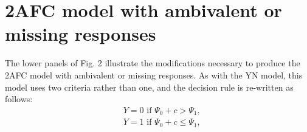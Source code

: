 \documentclass[man]{apa6}
\begin{document}
\section{2AFC model with ambivalent or missing responses}
The lower panels of Fig. 2 illustrate the modifications necessary to produce the 2AFC model with ambivalent or missing responses. As with the YN model, this model uses two criteria rather than one, and the decision rule is re-written as follows:
\begin{eqnarray*}
&Y=0\textrm{ if }\Psi_0+c>\Psi_1\textrm{,}\\
&Y=1\textrm{ if }\Psi_0+c\le\Psi_1\textrm{,}
\end{eqnarray*}
\end{document}
